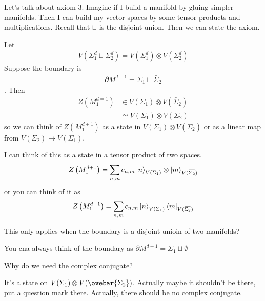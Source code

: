 Let's talk about axiom 3.
Imagine if I build a manifold by gluing simpler manifolds.
Then I can build my vector spaces by some tensor products and multiplications.
Recall that $\sqcup$ is the disjoint union.
Then we can state the axiom.
\begin{axiom}[Axiom 3]
    Let
    \begin{align}
        V\left( \Sigma_1^d \sqcup \Sigma_2^d  \right)
        =
        V\left( \Sigma_1^d \right) \otimes
        V\left( \Sigma_2^d \right)
    \end{align}
    Suppose the boundary is
    \begin{align}
        \partial M^{d+1} =
        \Sigma_1 \sqcup \bar{\Sigma}_2
    \end{align}.
    Then
    \begin{align}
        Z\left( M_1^{d=1} \right) &\in
        V\left( \Sigma_1 \right) \otimes V\left( \bar{\Sigma}_2 \right)\\
        &\simeq V\left( \Sigma_1 \right) \otimes \overbar{V(\Sigma_2)}
    \end{align}
    so we can think of $Z\left( M^{d+1}_1 \right)$
    as a state in
    $V\left( \Sigma_1 \right)\otimes V\left( \overbar{\Sigma_2} \right)$
    or as a linear map from
    $V\left( \Sigma_2 \right)\to V\left( \Sigma_1 \right)$.
\end{axiom}
I can think of this as a state in a tensor product of two spaces.
\begin{align}
    Z\left( M_1^{d+1} \right)
    = \sum_{n,m} c_{n,m}
    \ket{n}_{V(\Sigma_1)}
    \otimes \ket{m}_{V(\overbar{\Sigma_2})}
\end{align}
or you can think of it as
\begin{align}
    Z\left( M_1^{d+1} \right)
    = \sum_{n,m} c_{n,m}
    \ket{n}_{V(\Sigma_1)}
    \bra{m}_{V(\overbar{\Sigma_2})}
\end{align}

\begin{question}
This only applies when the boundary is a disjoint unioin of two manifolds?
\end{question}
You cna always think of the boundary as $\partial M^{d+1}=\Sigma_1 \sqcup
\emptyset$

\begin{question}
    Why do we need the complex conjugate?
\end{question}
It's a state on $V(\Sigma_1)\otimes V(\ovebar{\Sigma_2})$.
Actually maybe it shouldn't be there,
put a question mark there.
Actually, there should be no complex conjugate.


